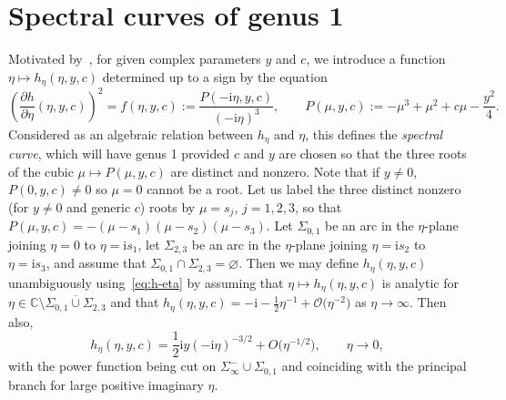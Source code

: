 \documentclass[pdftex]{sigma}
\numberwithin{equation}{section}
\begin{document}
\section{Spectral curves of genus 1}
Motivated by~\cite[Section 4.3]{BuckinghamM22}, for given complex parameters $y$ and $c$, we introduce a function $\eta\mapsto h_\eta(\eta,y,c)$ determined up to a sign by the equation
\begin{equation}
\left(\frac{\partial h}{\partial \eta}(\eta,y,c)\right)^2=f(\eta,y,c):=\frac{P(-\mathrm{i}\eta,y,c)}{(-\mathrm{i}\eta)^3},\qquad P(\mu,y,c):=-\mu^3+\mu^2+c\mu-\frac{y^2}{4}.
\label{eq:h-eta}
\end{equation}
Considered as an algebraic relation between $h_\eta$ and $\eta$, this defines the \emph{spectral curve}, which will have genus 1 provided $c$ and $y$ are chosen so that the three roots of the cubic $\mu\mapsto P(\mu,y,c)$ are distinct and nonzero. Note that if $y\neq 0$, $P(0,y,c)\neq 0$ so $\mu=0$ cannot be a root. Let us label the three distinct nonzero (for $y\neq 0$ and generic $c$) roots by $\mu=s_j$, $j=1,2,3$, so that $P(\mu,y,c)=-(\mu-s_1)(\mu-s_2)(\mu-s_3)$. Let $\Sigma_{0,1}$ be an arc in the $\eta$-plane joining $\eta=0$ to $\eta=\mathrm{i} s_1$, let $\Sigma_{2,3}$ be an arc in the $\eta$-plane joining $\eta=\mathrm{i} s_2$ to $\eta=\mathrm{i} s_3$, and assume that $\Sigma_{0,1}\cap\Sigma_{2,3}=\varnothing$.
Then we may define $h_\eta(\eta,y,c)$ unambiguously using~\eqref{eq:h-eta} by assuming that $\eta\mapsto h_\eta(\eta,y,c)$ is analytic for $\eta\in\mathbb{C}\setminus\overline{\Sigma_{0,1}\cup\Sigma_{2,3}}$ and that $h_\eta(\eta,y,c)=-\mathrm{i} -\frac{1}{2}\eta^{-1} +\mathcal{O}\bigl(\eta^{-2}\bigr)$ as $\eta\to\infty$. Then also,
\begin{equation*}
h_\eta(\eta,y,c)=\frac{1}{2}\mathrm{i} y(-\mathrm{i}\eta)^{-3/2}+O\bigl(\eta^{-1/2}\bigr),\qquad \eta\to 0,
\label{eq:hprime-zero}
\end{equation*}
with the power function being cut on $\Sigma_\infty^-\cup\Sigma_{0,1}$ and coinciding with the principal branch for large positive imaginary $\eta$.
\end{document}
